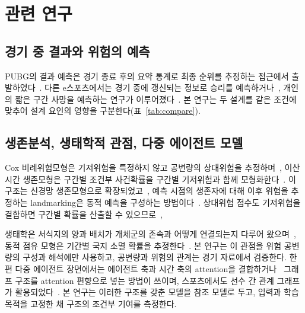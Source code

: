 \section{관련 연구}
\label{sec:related}

\subsection{경기 중 결과와 위험의 예측}
\label{sec:related:esports}

PUBG의 결과 예측은 경기 종료 후의 요약 통계로 최종 순위를 추정하는 접근에서 출발하였다~\cite{KagglePUBG,LeeLee25}.
다른 e스포츠에서는 경기 중에 갱신되는 정보로 승리를 예측하거나~\cite{Hodge21}, 개인의 짧은 구간 사망을 예측하는 연구가 이루어졌다~\cite{Katona19}.
본 연구는 두 설계를 같은 조건에 맞추어 설계 요인의 영향을 구분한다(표~\ref{tab:compare}).

\subsection{생존분석, 생태학적 관점, 다중 에이전트 모델}
\label{sec:related:survival}

Cox 비례위험모형은 기저위험을 특정하지 않고 공변량의 상대위험을 추정하며~\cite{Cox72}, 이산시간 생존모형은 구간별 조건부 사건확률을 구간별 기저위험과 함께 모형화한다~\cite{SingerWillett93}.
이 구조는 신경망 생존모형으로 확장되었고~\cite{Gensheimer19}, 예측 시점의 생존자에 대해 이후 위험을 추정하는 landmarking은 동적 예측을 구성하는 방법이다~\cite{vanHouwelingen07}.
상대위험 점수도 기저위험을 결합하면 구간별 확률을 산출할 수 있으므로~\cite{PrenticeGloeckler78}, 

생태학은 서식지의 양과 배치가 개체군의 존속과 어떻게 연결되는지 다루어 왔으며~\cite{Fahrig03}, 동적 점유 모형은 기간별 국지 소멸 확률을 추정한다~\cite{MacKenzie03}.
본 연구는 이 관점을 위험 공변량의 구성과 해석에만 사용하고, 공변량과 위험의 관계는 경기 자료에서 검증한다.
한편 다중 에이전트 장면에서는 에이전트 축과 시간 축의 attention을 결합하거나~\cite{Ngiam22} 그래프 구조를 attention 편향으로 넣는 방법이 쓰이며, 스포츠에서도 선수 간 관계 그래프가 활용되었다~\cite{Xenopoulos21}.
본 연구는 이러한 구조를 갖춘 모델을 참조 모델로 두고, 입력과 학습 목적을 고정한 채 구조의 조건부 기여를 측정한다.
